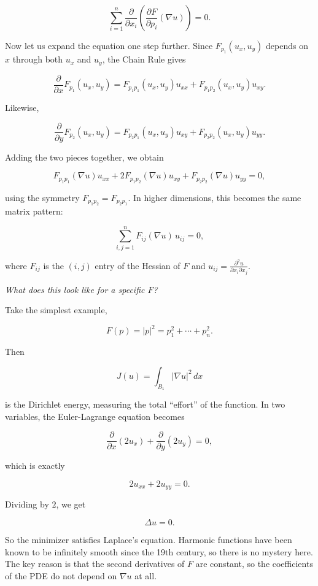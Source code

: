 \documentclass[11pt]{article}
\begin{document}
\[
\sum_{i=1}^n \frac{\partial}{\partial x_i}\!\left(\frac{\partial F}{\partial p_i}(\nabla u)\right)=0.
\]

Now let us expand the equation one step further. Since
\(F_{p_1}(u_x,u_y)\) depends on \(x\) through both \(u_x\) and \(u_y\),
the Chain Rule gives

\[
\frac{\partial}{\partial x}F_{p_1}(u_x,u_y)
=F_{p_1p_1}(u_x,u_y)u_{xx}+F_{p_1p_2}(u_x,u_y)u_{xy}.
\]

Likewise,

\[
\frac{\partial}{\partial y}F_{p_2}(u_x,u_y)
=F_{p_2p_1}(u_x,u_y)u_{xy}+F_{p_2p_2}(u_x,u_y)u_{yy}.
\]

Adding the two pieces together, we obtain
\hypertarget{eq-euler-lagrange-expanded}{}\label{eq-euler-lagrange-expanded}

\[
F_{p_1p_1}(\nabla u)u_{xx}
+2F_{p_1p_2}(\nabla u)u_{xy}
+F_{p_2p_2}(\nabla u)u_{yy}=0,
\]

using the symmetry \(F_{p_1p_2}=F_{p_2p_1}\). In higher dimensions, this
becomes the same matrix pattern:

\[
\sum_{i,j=1}^n F_{ij}(\nabla u)\,u_{ij}=0,
\]

where \(F_{ij}\) is the \((i,j)\) entry of the Hessian of \(F\) and
\(u_{ij}=\frac{\partial^2 u}{\partial x_i\partial x_j}\).

\emph{What does this look like for a specific \(F\)?}

Take the simplest example,

\[
F(p)=|p|^2=p_1^2+\cdots+p_n^2.
\]

Then

\[
J(u)=\int_{B_1}|\nabla u|^2\,dx
\]

is the Dirichlet energy, measuring the total ``effort'' of the function.
In two variables, the Euler-Lagrange equation becomes

\[
\frac{\partial}{\partial x}(2u_x)+\frac{\partial}{\partial y}(2u_y)=0,
\]

which is exactly

\[
2u_{xx}+2u_{yy}=0.
\]

Dividing by \(2\), we get

\[
\Delta u=0.
\]

So the minimizer satisfies Laplace's equation. Harmonic functions have
been known to be infinitely smooth since the 19th century, so there is
no mystery here. The key reason is that the second derivatives of \(F\)
are constant, so the coefficients of the PDE do not depend on
\(\nabla u\) at all.
\end{document}
